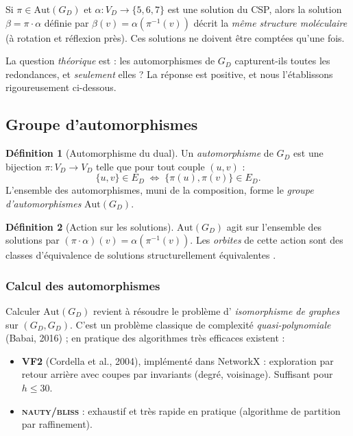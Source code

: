 \documentclass[12pt,a4paper]{article}
\theoremstyle{definition}
\newtheorem{definition}{D\'efinition}[section]
\theoremstyle{remark}
\newcommand{\GD}{G_{\!D}}
\newcommand{\VD}{V_{\!D}}
\newcommand{\ED}{E_{\!D}}
\newcommand{\Aut}{\mathrm{Aut}}
\begin{document}
Si $\pi \in \Aut(\GD)$ et $\alpha : \VD \to \{5,6,7\}$ est une solution
du CSP, alors la solution $\beta = \pi \cdot \alpha$ d\'efinie par
$\beta(v) = \alpha(\pi^{-1}(v))$ d\'ecrit la \emph{m\^eme structure
mol\'eculaire} (\`a rotation et r\'eflexion pr\`es). Ces solutions ne
doivent \^etre compt\'ees qu'une fois.

La question \emph{th\'eorique} est : \og les automorphismes de $\GD$
capturent-ils toutes les redondances, et \emph{seulement} elles ? \fg{}
La r\'eponse est positive, et nous l'\'etablissons rigoureusement
ci-dessous.

\subsection{Groupe d'automorphismes}

\begin{definition}[Automorphisme du dual]
Un \emph{automorphisme} de $\GD$ est une bijection $\pi : \VD \to \VD$
telle que pour tout couple $(u, v)$ :
\[
  \{u, v\} \in \ED \;\Longleftrightarrow\; \{\pi(u), \pi(v)\} \in \ED.
\]
L'ensemble des automorphismes, muni de la composition, forme le
\emph{groupe d'automorphismes} $\Aut(\GD)$.
\end{definition}

\begin{definition}[Action sur les solutions]
$\Aut(\GD)$ agit sur l'ensemble des solutions par
$(\pi \cdot \alpha)(v) = \alpha(\pi^{-1}(v))$. Les \emph{orbites} de
cette action sont des classes d'\'equivalence de solutions
\og structurellement \'equivalentes \fg{}.
\end{definition}

\subsubsection{Calcul des automorphismes}

Calculer $\Aut(\GD)$ revient \`a r\'esoudre le probl\`eme d'\emph{
isomorphisme de graphes} sur $(\GD, \GD)$. C'est un probl\`eme classique
de complexit\'e \emph{quasi-polynomiale} (Babai, 2016) ; en pratique des
algorithmes tr\`es efficaces existent :
\begin{itemize}
  \item \textbf{VF2} (Cordella et al., 2004), impl\'ement\'e dans
        NetworkX : exploration par retour arri\`ere avec coupes par
        invariants (degr\'e, voisinage). Suffisant pour $h \leq 30$.
  \item \textbf{\textsc{nauty}/\textsc{bliss}} : exhaustif et tr\`es
        rapide en pratique (algorithme de partition par raffinement).
\end{itemize}
\end{document}
